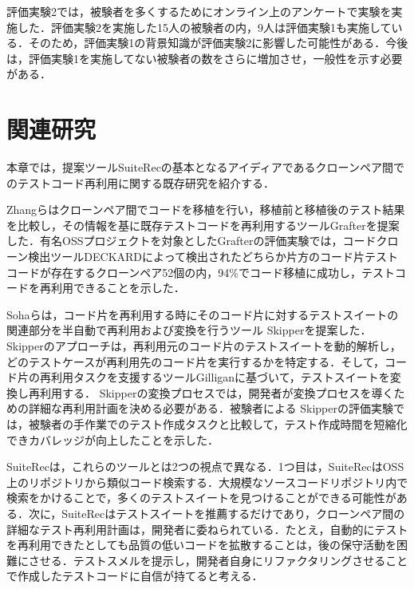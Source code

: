 \documentclass[12pt]{jarticle} %
\begin{document}
評価実験2では，被験者を多くするためにオンライン上のアンケートで実験を実施した．評価実験2を実施した15人の被験者の内，9人は評価実験1も実施している．そのため，評価実験1の背景知識が評価実験2に影響した可能性がある．今後は，評価実験1を実施してない被験者の数をさらに増加させ，一般性を示す必要がある．




\newpage
\section{関連研究}
本章では，提案ツール{\sf SuiteRec}の基本となるアイディアであるクローンペア間でのテストコード再利用に関する既存研究を紹介する．

Zhangら\cite{Zhang2017}はクローンペア間でコードを移植を行い，移植前と移植後のテスト結果を比較し，その情報を基に既存テストコードを再利用するツール{\sf Grafter}を提案した．有名OSSプロジェクトを対象とした{\sf Grafter}の評価実験では，コードクローン検出ツール{\sf DECKARD}\cite{Jiang2007}によって検出されたどちらか片方のコード片テストコードが存在するクローンペア52個の内，94\%でコード移植に成功し，テストコードを再利用できることを示した．

Sohaら\cite{skipper}は，コード片を再利用する時にそのコード片に対するテストスイートの関連部分を半自動で再利用および変換を行うツール{ \sf Skipper}を提案した．{ \sf Skipper}のアプローチは，再利用元のコード片のテストスイートを動的解析し，どのテストケースが再利用先のコード片を実行するかを特定する．そして，コード片の再利用タスクを支援するツール{\sf Gilligan}\cite{gilligan10,gilligan34}に基づいて，テストスイートを変換し再利用する．{ \sf Skipper}の変換プロセスでは，開発者が変換プロセスを導くための詳細な再利用計画を決める必要がある．被験者による{ \sf Skipper}の評価実験では，被験者の手作業でのテスト作成タスクと比較して，テスト作成時間を短縮化できカバレッジが向上したことを示した．

{\sf SuiteRec}は，これらのツールとは2つの視点で異なる．1つ目は，{\sf SuiteRec}はOSS上のリポジトリから類似コード検索する．大規模なソースコードリポジトリ内で検索をかけることで，多くのテストスイートを見つけることができる可能性がある．次に，{\sf SuiteRec}はテストスイートを推薦するだけであり，クローンペア間の詳細なテスト再利用計画は，開発者に委ねられている．たとえ，自動的にテストを再利用できたとしても品質の低いコードを拡散することは，後の保守活動を困難にさせる．テストスメルを提示し，開発者自身にリファクタリングさせることで作成したテストコードに自信が持てると考える．

\newpage
\end{document}
